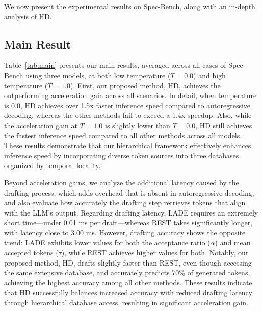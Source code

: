 % 
% 

We now present the experimental results on Spec-Bench, along with an in-depth analysis of HD.

\subsection{Main Result}

Table~\ref{tab:main} presents our main results, averaged across all cases of Spec-Bench using three models, at both low temperature (\(T=0.0\)) and high temperature (\(T=1.0\)). First, our proposed method, HD, achieves the outperforming acceleration gain across all scenarios. In detail, when temperature is 0.0, HD achieves over 1.5x faster inference speed compared to autoregressive decoding, whereas the other methods fail to exceed a 1.4x speedup. Also, while the acceleration gain at \(T=1.0\) is slightly lower than \(T=0.0\), HD still achieves the fastest inference speed compared to all other methods across all models. These results demonstrate that our hierarchical framework effectively enhances inference speed by incorporating diverse token sources into three databases organized by temporal locality.




Beyond acceleration gains, we analyze the additional latency caused by the drafting process, which adds overhead that is absent in autoregressive decoding, and also evaluate how accurately the drafting step retrieves tokens that align with the LLM’s output. 
Regarding drafting latency, LADE requires an extremely short time—under 0.01 ms per draft—whereas REST takes significantly longer, with latency close to 3.00 ms. 
However, drafting accuracy shows the opposite trend: LADE exhibits lower values for both the acceptance ratio (\(\alpha\)) and mean accepted tokens (\(\tau\)), while REST achieves higher values for both. 
Notably, our proposed method, HD, drafts slightly faster than REST, even though accessing the same extensive database, and accurately predicts 70\% of generated tokens, achieving the highest accuracy among all other methods. 
These results indicate that HD successfully balances increased accuracy with reduced drafting latency through hierarchical database access, resulting in significant acceleration gain.

